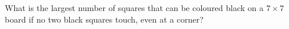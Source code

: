 What is the largest number of squares that can be coloured black on a $7\times7$ board if no two black squares touch, even at a corner?
